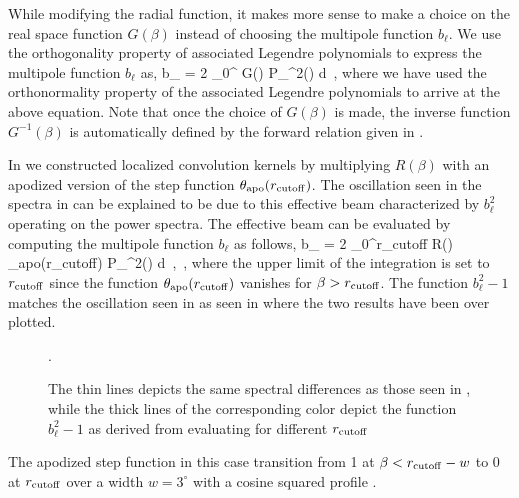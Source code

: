 While modifying the radial function, it makes more sense to make a choice on the real space function $G(\beta)$ instead of choosing the multipole function $b_{\ell}$. We use the orthogonality property of associated Legendre polynomials to express the multipole function $b_{\ell}$ as,
%
\beq
b_{\ell} = 2 \pi {} \int _{0}^{\pi} G(\beta) P_{\ell}^{2}(\cos{\beta}) d\cos{\beta} \,, \label{eq:gb2bl}
\eeq
%
where we have used the orthonormality property of the associated Legendre polynomials to arrive at the above equation. Note that once the choice of $G(\beta)$ is made, the inverse function $G^{-1}(\beta)$ is automatically defined by the forward relation given in .

In  we constructed localized convolution kernels by multiplying $R(\beta)$ with an apodized version of the step function $\theta_{\rm apo}(r_{\rm cutoff})$. The oscillation seen in the spectra in  can be explained to be due to this effective beam characterized by $b_{\ell}^2$ operating on the power spectra. The effective beam can be evaluated by computing the multipole function $b_{\ell}$ as follows,
%
\beq
b_{\ell} = 2 \pi {} \int _{0}^{r_{\rm cutoff}} R(\beta) \theta_{\rm apo}(r_{\rm cutoff})  P_{\ell}^{2}(\cos{\beta}) d\cos{\beta} \,, \label{eq:gb2bl} \,,
\eeq
%
where the upper limit of the integration is set to $r_{\rm cutoff}$ since the function $\theta_{\rm apo}(r_{\rm cutoff})$ vanishes for $\beta>r_{\rm cutoff}$. The function $b^2_{\ell}-1$ matches the oscillation seen in  as  seen in  where the two results have been over plotted.
%
\begin{figure}[!t] 
\centering
{}
\caption{The thin lines depicts the same spectral differences as those seen in , while the thick lines of the corresponding color depict the function $b_{\ell}^2 -1$ as derived from evaluating  for different $r_{\rm cutoff}$}.
\label{fig:match_cl_oscillations}
\end{figure}
%
The apodized step function in this case transition from 1 at $\beta < r_{\rm cutoff} -w$ to 0 at $r_{\rm cutoff}$ over a width $w= 3^{\circ}$ with a cosine squared profile .

%
\begin{figure}[!t] 
\centering
{}
\caption{}
\label{fig:example_gbeta}
\end{figure}
%

